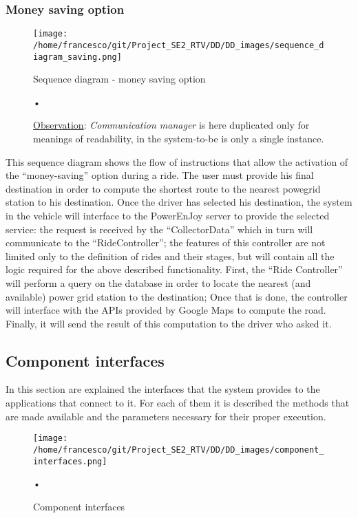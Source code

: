 \documentclass[10pt, a4paper,titlepage]{article}
\begin{document}
\subsubsection{Money saving option}
\begin{figure}[h]
\begin{center}
\texttt{[image: /home/francesco/git/Project\_SE2\_RTV/DD/DD\_images/sequence\_diagram\_saving.png]}
\caption{Sequence diagram - money saving option}
\caption*{\underline{Observation}: \emph{Communication manager} is here duplicated only for meanings of readability, in the system-to-be is only a single instance.}
\label{fig:sequence_diagram_saving}
\end{center}•
\end{figure}
This sequence diagram shows the flow of instructions that allow the activation of the “money-saving” option during a ride.
The user must provide his final destination in order to compute the shortest route to the nearest powegrid station to his destination.
Once the driver has selected his destination, the system in the vehicle will interface to the PowerEnJoy server to provide the selected service: the request is received by the “CollectorData” which in turn will communicate to the “RideController”; the features of this controller are not limited only to the definition of rides and their stages, but will contain all the logic required for the above described functionality.
First, the “Ride Controller” will perform a query on the database in order to locate the nearest (and available) power grid station to the destination; Once that is done, the controller will interface with the APIs provided by Google Maps to compute the road.
Finally, it will send the result of this computation to the driver who asked it.
\clearpage
\subsection{Component interfaces}
In this section are explained the interfaces that the system provides to the applications that connect to it. For each of them it is described the methods that are made available and the parameters necessary for their proper execution.
\begin{figure}[h]
\begin{center}
\texttt{[image: /home/francesco/git/Project\_SE2\_RTV/DD/DD\_images/component\_interfaces.png]}
\caption{Component interfaces}
\label{fig:scomponent_interfaces}
\end{center}•
\end{figure}
\end{document}

